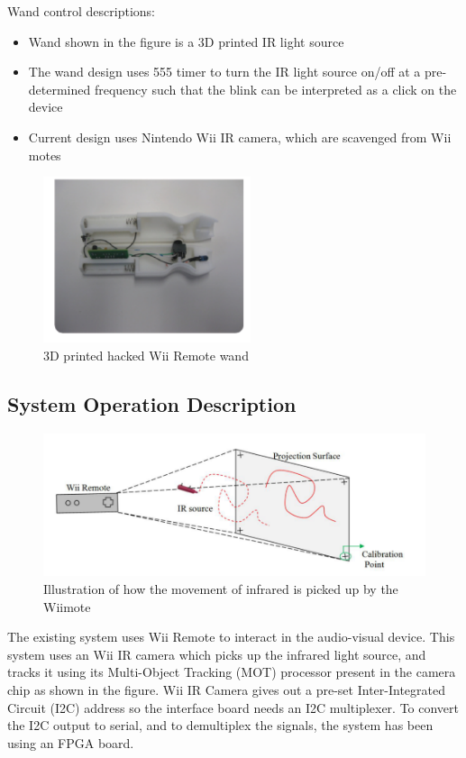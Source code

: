 \documentclass[12pt, a4paper]{article}
\begin{document}
\newpage

Wand control descriptions:
\begin{itemize}
\item Wand shown in the figure is a 3D printed IR light source
\item The wand design uses 555 timer to turn the IR light source on/off at a pre-determined frequency such that the blink can be interpreted as a click on the device
\item Current design uses Nintendo Wii IR camera, which are scavenged from Wii motes
\end{itemize}

\begin{figure}[htp]
\centering
\includegraphics[width=2.4in]{wand1}
\caption{3D printed hacked Wii Remote wand}
\label{}
\end{figure}

\subsection{System Operation Description}
\begin{figure}[htp]
\centering
\includegraphics[scale=0.35]{wiiiii.png}
\caption{Illustration of how the movement of infrared is picked up by the Wiimote}
\label{}
\end{figure}

The existing system uses Wii Remote to interact in the audio-visual device. This system uses an Wii IR camera which picks up the infrared light source, and tracks it using its Multi-Object Tracking (MOT) processor present in the camera chip as shown in the figure. Wii IR Camera gives out a pre-set Inter-Integrated Circuit (I2C) address so the interface board needs an I2C multiplexer. To convert the I2C output to serial, and to demultiplex the signals, the system has been using an FPGA board. 
\newpage
\end{document}
